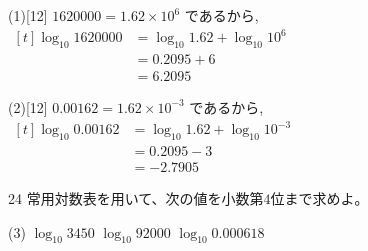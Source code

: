 \documentclass[14pt,dvipdfmx]{jsarticle}
\begin{document}
\vspace{-1.4zw}
\begin{answerbox}{(1)}[12]
  $1620000 = 1.62 \times 10^{6}$ であるから,\\
  $\begin{aligned}[t]
    \log_{10} 1620000 &= \log_{10} 1.62 + \log_{10} 10^{6} \\
    &= 0.2095 + 6 \\
    &= 6.2095
  \end{aligned}$
\end{answerbox}
\vspace{0.12em}
\begin{answerbox}{(2)}[12]
  $0.00162 = 1.62 \times 10^{-3}$ であるから,\\
  $\begin{aligned}[t]
    \log_{10} 0.00162 &= \log_{10} 1.62 + \log_{10} 10^{-3} \\
    &= 0.2095 - 3 \\
    &= -2.7905
  \end{aligned}$
\end{answerbox}

\vfill
\nextpage

\begin{practiceprob}{24}
  常用対数表を用いて、次の値を小数第$4$位まで求めよ。
  \begin{tasks}[label=(\arabic*), label-width=1.6zw, item-indent=2zw, after-item-skip=0.06em](3)
    \task $\log_{10} 3450$
    \task $\log_{10} 92000$
    \task $\log_{10} 0.000618$
  \end{tasks}
\end{practiceprob}
\end{document}
